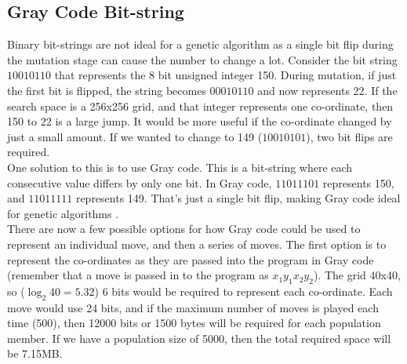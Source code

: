\documentclass[]{report}
\begin{document}
\subsection{Gray Code Bit-string}

Binary bit-strings are not ideal for a genetic algorithm as a single bit flip during the mutation stage can cause the number to change a lot. Consider the bit string $10010110$ that represents the 8 bit unsigned integer 150. During mutation, if just the first bit is flipped, the string becomes $00010110$ and now represents 22. If the search space is a 256x256 grid, and that integer represents one co-ordinate, then 150 to 22 is a large jump. It would be more useful if the co-ordinate changed by just a small amount. If we wanted to change to 149 ($10010101$), two bit flips are required. \\

One solution to this is to use Gray code. This is a bit-string where each consecutive value differs by only one bit. In Gray code, $11011101$ represents 150, and $11011111$ represents 149. That's just a single bit flip, making Gray code ideal for genetic algorithms \cite{ECIntro}. \\

There are now a few possible options for how Gray code could be used to represent an individual move, and then a series of moves. The first option is to represent the co-ordinates as they are passed into the program in Gray code (remember that a move is passed in to the program as $x_1 y_1 x_2 y_2$). The grid 40x40, so ($\log _2 40 = 5.32$) 6 bits would be required to represent each co-ordinate. Each move would use 24 bits, and if the maximum number of moves is played each time (500), then 12000 bits or 1500 bytes will be required for each population member. If we have a population size of 5000, then the total required space will be 7.15MB.  \\
\end{document}
